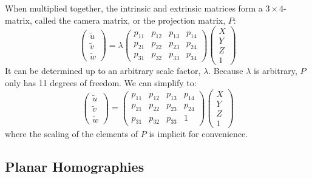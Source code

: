When multiplied together, the intrinsic and extrinsic matrices form a $3\times4$-matrix, called the camera matrix, or the projection matrix, $P$:
\begin{equation} \label{eq:projection2}
\begin{pmatrix} \tilde{u} \\ \tilde{v} \\ \tilde{w} \end{pmatrix} = \lambda
\begin{pmatrix} p_{11} & p_{12} & p_{13} & p_{14} \\
 				p_{21} & p_{22} & p_{23} & p_{24} \\
				p_{31} & p_{32} & p_{33} & p_{34} \end{pmatrix}
\begin{pmatrix}X \\Y \\Z \\1\end{pmatrix}
\end{equation}
It can be determined up to an arbitrary scale factor, $\lambda$.
Because $\lambda$ is arbitrary, $P$ only has 11 degrees of freedom. We can simplify to:
\begin{equation}\label{eq:projection3}
\begin{pmatrix} \tilde{u} \\ \tilde{v} \\ \tilde{w} \end{pmatrix} =
\begin{pmatrix} p_{11} & p_{12} & p_{13} & p_{14} \\
 				p_{21} & p_{22} & p_{23} & p_{24} \\
				p_{31} & p_{32} & p_{33} & 1 \end{pmatrix}
\begin{pmatrix}X \\Y \\Z \\1\end{pmatrix}
\end{equation}
where the scaling of the elements of $P$ is implicit for convenience. \cite[153-165]{hartley-zisserman}

\subsection{Planar Homographies}\label{planar-homographies}

